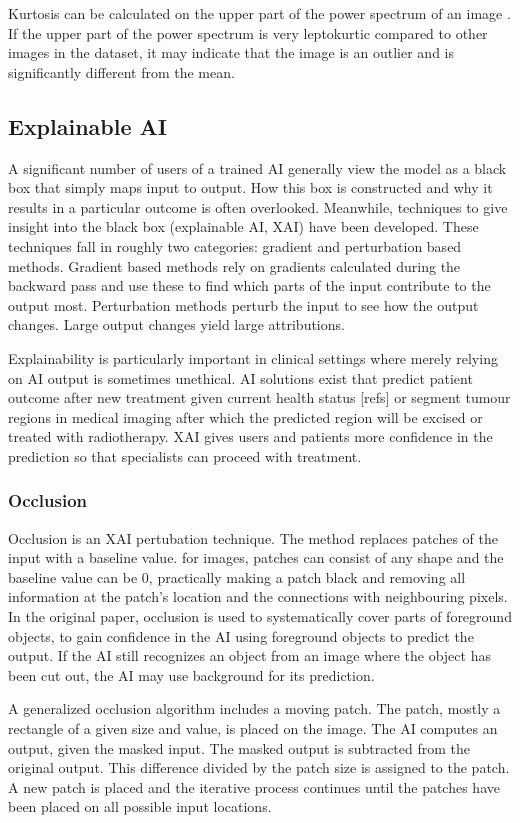 Kurtosis can be calculated on the upper part of the power spectrum of an image \cite{Koho2016,Blokker2022}.
If the upper part of the power spectrum is very leptokurtic compared to other images in the dataset, it may indicate that the image is an outlier and is significantly different from the mean.

\subsection{Explainable AI}
A significant number of users of a trained AI generally view the model as a black box that simply maps input to output.
How this box is constructed and why it results in a particular outcome is often overlooked.
Meanwhile, techniques to give insight into the black box (explainable AI, XAI) have been developed.
These techniques fall in roughly two categories: gradient and perturbation based methods.
Gradient based methods rely on gradients calculated during the backward pass and use these to find which parts of the input contribute to the output most.
Perturbation methods perturb the input to see how the output changes.
Large output changes yield large attributions.

Explainability is particularly important in clinical settings where merely relying on AI output is sometimes unethical.
AI solutions exist that predict patient outcome after new treatment given current health status [refs] or segment tumour regions in medical imaging after which the predicted region will be excised or treated with radiotherapy.
XAI gives users and patients more confidence in the prediction so that specialists can proceed with treatment.

\subsubsection{Occlusion}\label{subsec:occlusion}
Occlusion \cite{Zeiler2013} is an XAI pertubation technique.
The method replaces patches of the input with a baseline value.
\eg for images, patches can consist of any shape and the baseline value can be 0, practically making a patch black and removing all information at the patch's location and the connections with neighbouring pixels.
In the original paper, occlusion is used to systematically cover parts of foreground objects, to gain confidence in the AI using foreground objects to predict the output.
If the AI still recognizes an object from an image where the object has been cut out, the AI may use background for its prediction.

A generalized occlusion algorithm includes a moving patch.
The patch, mostly a rectangle of a given size and value, is placed on the image.
The AI computes an output, given the masked input.
The masked output is subtracted from the original output.
This difference divided by the patch size is assigned to the patch.
A new patch is placed and the iterative process continues until the patches have been placed on all possible input locations.
